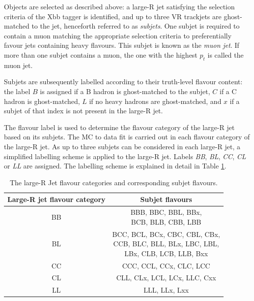 \documentclass[10pt,a4paper]{book}
\begin{document}
Objects are selected as described above: a large-R jet satisfying the selection criteria of the Xbb tagger is identified, and up to three VR trackjets are ghost-matched to the jet, henceforth referred to as \emph{subjets}. One subjet is required to contain a muon matching the appropriate selection criteria to preferentially favour jets containing heavy flavours. This subjet is known as the \emph{muon jet}. If more than one subjet contains a muon, the one with the highest $p_t$ is called the muon jet.

Subjets are subsequently labelled according to their truth-level flavour content: the label $B$ is assigned if a B hadron is ghost-matched to the subjet, $C$ if a C hadron is ghost-matched, $L$ if no heavy hadrons are ghost-matched, and $x$ if a subjet of that index is not present in the large-R jet.  

The flavour label is used to determine the flavour category of the large-R jet based on its subjets. The MC to data fit is carried out in each flavour category of the large-R jet. As up to three subjets can be considered in each large-R jet, a simplified labelling scheme is applied to the large-R jet. Labels \emph{BB}, \emph{BL}, \emph{CC}, \emph{CL} or \emph{LL} are assigned. The labelling scheme is explained in detail in Table \ref{tab:jet_flavors}.

\begin{table}[h]
\label{tab:jet_flavors}
\centering
\begin{tabular}{|c|c|}
\hline 
\textbf{Large-R jet flavour category} & \textbf{Subjet flavours} \\ 
\hline 
BB & \makecell{BBB, BBC, BBL, BBx,\\ BCB, BLB, CBB, LBB} \\ 
\hline 
BL & \makecell{BCC, BCL, BCx, CBC, CBL, CBx,\\ CCB, BLC, BLL, BLx, LBC, LBL,\\ LBx, CLB, LCB, LLB, Bxx} \\ 
\hline 
CC & CCC, CCL, CCx, CLC, LCC \\ 
\hline 
CL & CLL, CLx, LCL, LCx, LLC, Cxx \\ 
\hline 
LL & LLL, LLx, Lxx \\ 
\hline 
\end{tabular} 
\caption{The large-R Jet flavour categories and corresponding subjet flavours.}
\end{table}

\end{document}
